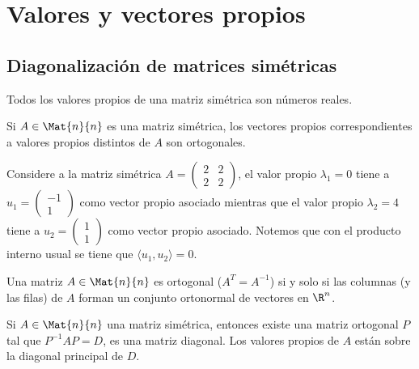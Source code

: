\documentclass[compacto,10pt]{pubciencias-notas}
\begin{document}
\encabezado
\vspace*{-8mm}

\setcounter{section}{6}
\section{Valores y vectores propios}
\setcounter{subsection}{3}
\subsection{Diagonalización de matrices simétricas}

\begin{teo}
Todos los valores propios de una matriz simétrica son números reales.
\end{teo}

\begin{teo}
Si $A\in\Mat{n}{n}$ es una matriz simétrica, los vectores propios correspondientes a valores propios distintos de $A$ son ortogonales.
\end{teo}

\begin{ejem}\hspace{0pt}\label{Cap7:ejem05} Considere a la matriz simétrica $A=\begin{pmatrix}2&2\\2&2\end{pmatrix}$, el valor propio $\lambda_1=0$ tiene a $u_{1} =\begin{pmatrix}-1\\1\end{pmatrix}$ como vector propio asociado mientras que el valor propio $\lambda_2=4$ tiene a $u_{2} =\begin{pmatrix}1\\1\end{pmatrix}$ como vector propio asociado. Notemos que con el producto interno usual se tiene que $\langle u_{1}, u_{2}\rangle = 0$.
\end{ejem}

\begin{prop}
Una matriz $A\in\Mat{n}{n}$ es ortogonal ($A^{T} = A^{-1}$) si y solo si las columnas (y las filas) de $A$ forman un conjunto ortonormal de vectores en $\R^{n}$.
\end{prop}

\begin{teo}
Si $A\in\Mat{n}{n}$ una matriz simétrica, entonces existe una matriz ortogonal $P$ tal que $P^{-1}AP = D$, es una matriz diagonal. Los valores propios de $A$ están sobre la diagonal principal de $D$.
\end{teo}
\end{document}
